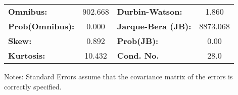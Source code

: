 \begin{center}
\begin{tabular}{lcccccc}
\bottomrule
\end{tabular}
\begin{tabular}{lclc}
\textbf{Omnibus:}       & 902.668 & \textbf{  Durbin-Watson:     } &    1.860  \\
\textbf{Prob(Omnibus):} &   0.000 & \textbf{  Jarque-Bera (JB):  } & 8873.068  \\
\textbf{Skew:}          &   0.892 & \textbf{  Prob(JB):          } &     0.00  \\
\textbf{Kurtosis:}      &  10.432 & \textbf{  Cond. No.          } &     28.0  \\
\bottomrule
\end{tabular}
\end{center}

Notes: \newline
 [1] Standard Errors assume that the covariance matrix of the errors is correctly specified.